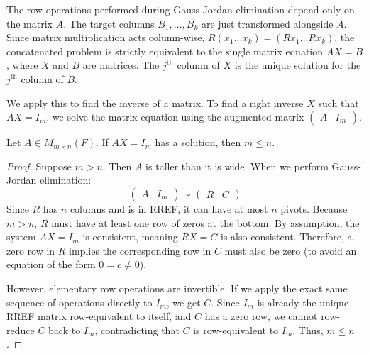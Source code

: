 \documentclass[../linear_algebra_and_groups.tex]{subfiles}
\begin{document}
\begin{remark}
    The row operations performed during Gauss-Jordan elimination depend only on the matrix $A$. The target columns $B_1, \dots, B_k$ are just transformed alongside $A$. Since matrix multiplication acts column-wise, $R(x_1 \dots x_k) = (Rx_1 \dots Rx_k)$, the concatenated problem is strictly equivalent to the single matrix equation $AX=B$, where $X$ and $B$ are matrices. The $j^{\mathrm{th}}$ column of $X$ is the unique solution for the $j^{\mathrm{th}}$ column of $B$.
\end{remark}

We apply this to find the inverse of a matrix. To find a right inverse $X$ such that $AX=I_m$, we solve the matrix equation using the augmented matrix $\left(\begin{array}{c|c} A & I_m \end{array}\right)$.

\begin{proposition}
\label{prop:rightinvbound}
    \begin{shaded*}
        Let $A\in M_{m\times n}(F)$. If $AX=I_m$ has a solution, then $m\le n$.
    \end{shaded*}
\end{proposition}
\begin{proof}
    Suppose $m>n$. Then $A$ is taller than it is wide. When we perform Gauss-Jordan elimination:
    \[ \left(\begin{array}{c|c} A & I_m \end{array}\right) \sim \left(\begin{array}{c|c} R & C \end{array}\right) \]
    Since $R$ has $n$ columns and is in RREF, it can have at most $n$ pivots. Because $m>n$, $R$ must have at least one row of zeros at the bottom. By assumption, the system $AX=I_m$ is consistent, meaning $RX=C$ is also consistent. Therefore, a zero row in $R$ implies the corresponding row in $C$ must also be zero (to avoid an equation of the form $0 = c \neq 0$).
    
    However, elementary row operations are invertible. If we apply the exact same sequence of operations directly to $I_m$, we get $C$. Since $I_m$ is already the unique RREF matrix row-equivalent to itself, and $C$ has a zero row, we cannot row-reduce $C$ back to $I_m$, contradicting that $C$ is row-equivalent to $I_m$. Thus, $m\le n$.
    \qedhere
\end{proof}
\end{document}
